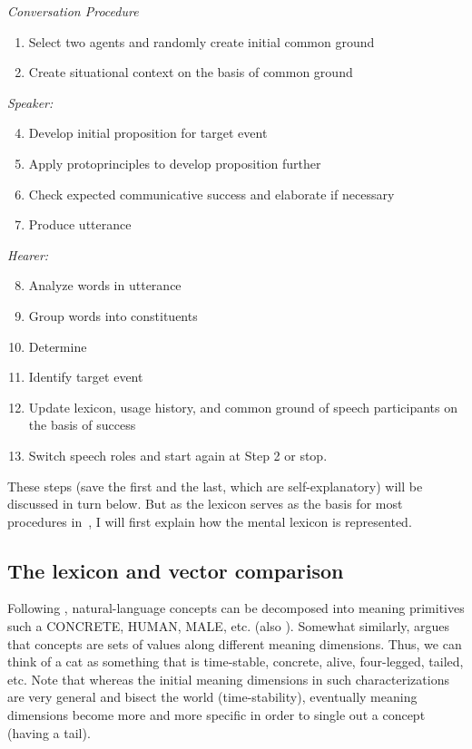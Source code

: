 \documentclass[output=paper]{LSP/langsci}
\begin{document}
\ea\label{17-le-ex:4:Conversation Procedure}
\textit{Conversation Procedure}
\begin{enumerate}
\item Select two agents and randomly create initial common ground
\item Create situational context on the basis of common ground
\end{enumerate}
\textit{Speaker:}
\begin{enumerate}
\setcounter{enumi}{3}
\item Develop initial proposition for target event 
\item Apply protoprinciples to develop proposition further
\item Check expected communicative success and elaborate if necessary
\item Produce utterance
\end{enumerate}
\textit{Hearer:}
\begin{enumerate}
\setcounter{enumi}{7}
\item Analyze words in utterance
\item Group words into constituents
\item Determine 
\item Identify target event
\end{enumerate}
\begin{enumerate}
\setcounter{enumi}{11}
\item Update lexicon, usage history, and common ground of speech participants on the basis of success
\item Switch speech roles and start again at Step 2 or stop.
\end{enumerate}
\z

These steps (save the first and the last, which are self-explanatory) will be discussed in turn below. But as the lexicon serves as the basis for most procedures in~, I will first explain how the mental lexicon is represented.

\subsection{The lexicon and vector comparison}\label{17-le-sec:Lexicon}
Following \cite{Wierzbicka1996Semantics}, natural-language concepts can be decomposed into meaning primitives such a CONCRETE, HUMAN, MALE, etc. (\cf also \citealt{Guiraud1969Semic}). Somewhat similarly, \citet{Gaerdenfors2000Conceptual} argues that concepts are sets of values along different meaning dimensions. Thus, we can think of a cat as something that is time-stable, concrete, alive, four-legged, tailed, etc. Note that whereas the initial meaning dimensions in such characterizations are very general and bisect the world (\eg time-stability), eventually meaning dimensions become more and more specific in order to single out a concept (\eg having a tail).
\end{document}
